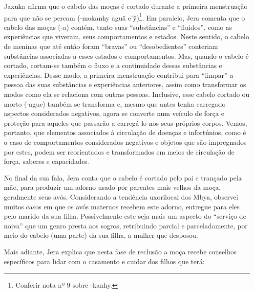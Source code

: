 Jaxuka afirma que o cabelo das moças é cortado durante a primeira
menstruação para que não se percam (-mokanhy aguã
e’\~{y})\footnote{Conferir nota nº 9 sobre -kanhy.}. Em paralelo,
Jera comenta que o cabelo das moças (-a) contém, tanto suas
``substâncias'' e ``fluidos'', como as experiências que viveram, seus
comportamentos e estados. Neste sentido, o cabelo de meninas que até
então foram ``bravas'' ou ``desobedientes'' conteriam substâncias
associadas a esses estados e comportamentos. Mas, quando o cabelo é
cortado, cortam-se também o fluxo e a continuidade dessas substâncias e
experiências. Desse modo, a primeira menstruação contribui para
``limpar'' a pessoa das suas substâncias e experiências anteriores, assim
como transformar os modos como ela se relaciona com outras pessoas.
Inclusive, esse cabelo cortado ou morto (-ague) também se transforma e,
mesmo que antes tenha carregado aspectos considerados negativos, agora
se converte num veículo de força e proteção para aqueles que passarão a
carregá-lo nos seus próprios corpos. Vemos, portanto, que elementos
associados à circulação de doenças e infortúnios, como é o caso de
comportamentos considerados negativos e objetos que são impregnados por
estes, podem ser reorientados e transformados em meios de circulação de
força, saberes e capacidades. 

No final da sua fala, Jera conta que o cabelo é cortado pelo pai e
trançado pela mãe, para produzir um adorno usado por parentes mais
velhos da moça, geralmente seus avós. Considerando a tendência
uxorilocal dos Mbya, observei muitos casos em que os avós maternos
recebem este adorno, entregue para eles pelo marido da sua filha.
Possivelmente este seja mais um aspecto do ``serviço de noiva'' que um
genro presta aos sogros, retribuindo parcial e parceladamente, por meio
do cabelo (uma parte) da sua filha, a mulher que desposou. 

Mais adiante, Jera explica que nesta fase de reclusão a moça recebe
conselhos específicos para lidar com o casamento e cuidar dos filhos
que terá: 

